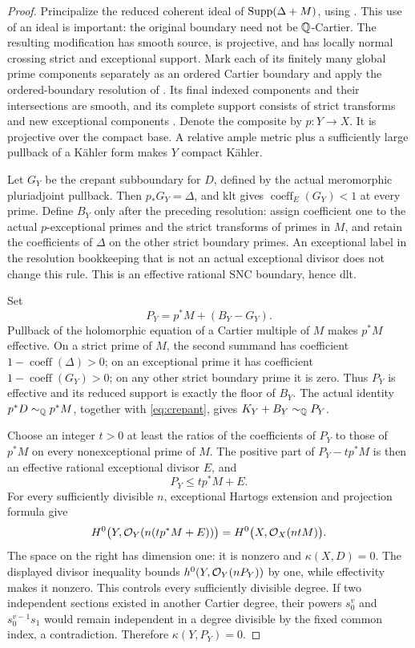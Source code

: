 \begin{proof}
Principalize the reduced coherent ideal of \(\operatorname{Supp}(\Delta+M)\), using
\cite[Theorem~2.13 and Remark~2.14]{DasHaconPaun2024}.  This use of an
ideal is important: the original boundary need not be \(\mathbb Q\)-Cartier.
The resulting modification has smooth source, is projective, and has locally normal
crossing strict and exceptional support.  Mark each of its finitely many
global prime components separately as an ordered Cartier boundary and
apply the ordered-boundary resolution of
\cite[Theorems~1.1.3 and~1.1.13]{Temkin2017}.  Its final indexed
components and their intersections are smooth, and its complete support
consists of strict transforms and new exceptional components
\cite[Lemmas~2.1.10 and~2.2.9(iv)]{Temkin2017}.  Denote the composite by
\(p:Y\to X\).  It is projective over the compact base.  A relative ample
metric plus a sufficiently large pullback of a K\"ahler form makes \(Y\)
compact K\"ahler.

Let \(G_Y\) be the crepant subboundary for \(D\), defined by the actual
meromorphic pluriadjoint pullback.  Then \(p_*G_Y=\Delta\), and klt gives
\(\operatorname{coeff}_E(G_Y)<1\) at every prime.  Define \(B_Y\) only
after the preceding resolution: assign coefficient one to the actual
\(p\)-exceptional primes and the strict transforms of primes in \(M\),
and retain the coefficients of \(\Delta\) on the other strict boundary
primes.  An exceptional label in the resolution bookkeeping that is not
an actual exceptional divisor does not change this rule.  This is an
effective rational SNC boundary, hence dlt.

Set
\begin{equation}\label{eq:prepared-P}
 P_Y=p^*M+(B_Y-G_Y).
\end{equation}
Pullback of the holomorphic equation of a Cartier multiple of \(M\)
makes \(p^*M\) effective.  On a strict prime of \(M\), the second summand
has coefficient \(1-\operatorname{coeff}(\Delta)>0\); on an exceptional
prime it has coefficient \(1-\operatorname{coeff}(G_Y)>0\); on any other
strict boundary prime it is zero.  Thus \(P_Y\) is effective and its
reduced support is exactly the floor of \(B_Y\).  The actual identity
\(p^*D\sim_\mathbb Q p^*M\), together with \eqref{eq:crepant}, gives
\(K_Y+B_Y\sim_\mathbb Q P_Y\).

Choose an integer \(t>0\) at least the ratios of the coefficients of
\(P_Y\) to those of \(p^*M\) on every nonexceptional prime of \(M\).
The positive part of \(P_Y-tp^*M\) is then an effective rational
exceptional divisor \(E\), and
\[
 P_Y\leq tp^*M+E.
\]
For every sufficiently divisible \(n\), exceptional Hartogs extension
and projection formula give
\[
 H^0\bigl(Y,\mathcal O_Y(n(tp^*M+E))\bigr)
 =H^0\bigl(X,\mathcal O_X(ntM)\bigr).
\]
The space on the right has dimension one: it is nonzero and
\(\kappa(X,D)=0\).  The displayed divisor inequality bounds
\(h^0(Y,\mathcal O_Y(nP_Y))\) by one, while effectivity makes it nonzero.
This controls every sufficiently divisible degree.  If two independent
sections existed in another Cartier degree, their powers \(s_0^v\) and
\(s_0^{v-1}s_1\) would remain independent in a degree divisible by the
fixed common index, a contradiction.  Therefore \(\kappa(Y,P_Y)=0\).
\end{proof}

